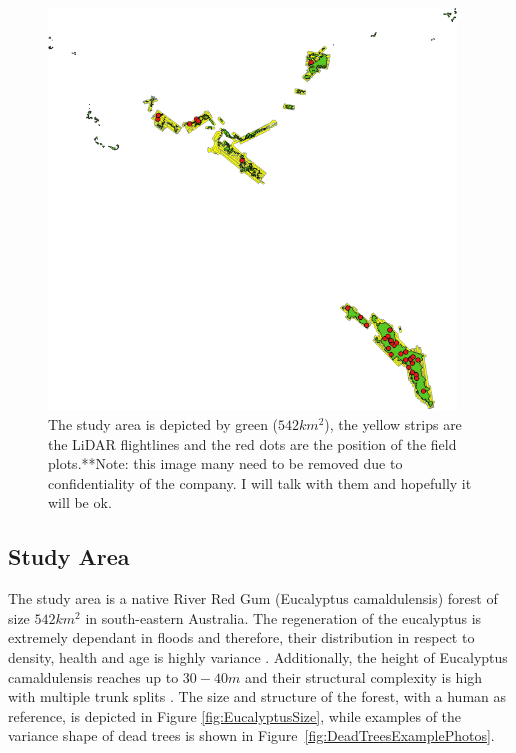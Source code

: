 \documentclass{subfiles}
\begin{document}
\begin{figure} [h!]
	\centering
	\begin{framed}
		\includegraphics[width=0.965\textwidth]{img/dead/StudyArea}
	\end{framed}
	\caption{The study area is depicted by green ($542km^2$), the yellow strips are the LiDAR flightlines and the red dots are the position of the field plots.{\color{red}**Note: this image many need to be removed due to confidentiality of the company. I will talk with them and hopefully it will be ok.}}
	\label{fig:StudyArea}
\end{figure}

\subsection{Study Area} \label{sec:StudyArea}

The study area is a native River Red Gum (Eucalyptus camaldulensis) forest  of size $542km^2$ in south-eastern Australia. The regeneration of the eucalyptus is extremely dependant in floods and therefore, their distribution in respect to density, health and age is highly variance \cite{Kerle2005}. Additionally, the height of Eucalyptus camaldulensis reaches up to $30-40m$ and their structural complexity is high with multiple trunk splits \cite{Wilson1995}. The size and structure of the forest, with a human as reference, is depicted in Figure \ref{fig:EucalyptusSize}, while examples of the variance shape of dead trees is shown in Figure~\ref{fig:DeadTreesExamplePhotos}. 
\end{document}
